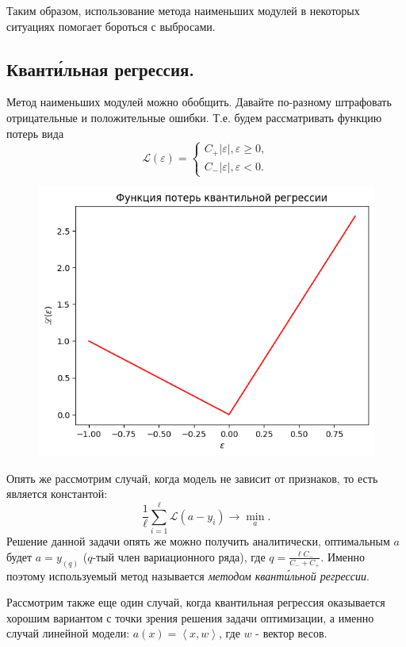 Таким образом, использование метода наименьших модулей в некоторых ситуациях помогает бороться с выбросами.

\subsection*{Квант\'{и}льная регрессия.}

Метод наименьших модулей можно обобщить. Давайте по-разному штрафовать отрицательные и положительные ошибки. Т.е. будем рассматривать функцию потерь вида
$$\mathscr{L}(\varepsilon) = \begin{cases}
    C_+|\varepsilon|, \varepsilon \geq 0,\\
    C_-|\varepsilon|, \varepsilon < 0.
\end{cases}$$

\begin{figure}[h]
    \centering
    \includegraphics{chapters/nonstandart_error/images/ФПКР.png}
\end{figure}

Опять же рассмотрим случай, когда модель не зависит от признаков, то есть является константой:
$$\frac{1}{\ell}\sum\limits_{i=1}^\ell\mathscr{L}\left(a - y_i\right) \longrightarrow \min\limits_{a}.$$
Решение данной задачи опять же можно получить аналитически, оптимальным $a$ будет $a = y_{(q)}$ ($q$-тый член вариационного ряда), где $q = \frac{\ell C_-}{C_- + C_+}$.
Именно поэтому используемый метод называется \textit{методом квант\'{и}льной регрессии}.

Рассмотрим также еще один случай, когда квантильная регрессия оказывается хорошим вариантом с точки зрения решения задачи оптимизации, а именно случай линейной модели: $a(x) = \left\langle x, w \right\rangle$, где $w$ - вектор весов.

